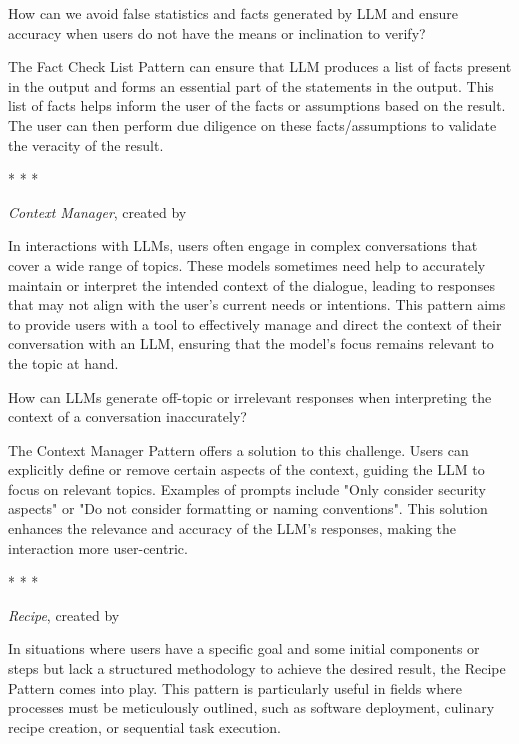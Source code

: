  How can we avoid false statistics and facts generated by LLM and ensure accuracy when users do not have the means or inclination to verify?

 The Fact Check List Pattern can ensure that LLM produces a list of facts present in the output and forms an essential part of the statements in the output. This list of facts helps inform the user of the facts or assumptions based on the result. The user can then perform due diligence on these facts/assumptions to validate the veracity of the result.

\begin{center}
*           *           * 
\end{center}

\textit{Context Manager}, created by \textcite{white2023prompt}

 In interactions with LLMs, users often engage in complex conversations that cover a wide range of topics. These models sometimes need help to accurately maintain or interpret the intended context of the dialogue, leading to responses that may not align with the user's current needs or intentions. This pattern aims to provide users with a tool to effectively manage and direct the context of their conversation with an LLM, ensuring that the model's focus remains relevant to the topic at hand.

How can LLMs generate off-topic or irrelevant responses when interpreting the context of a conversation inaccurately?

 The Context Manager Pattern offers a solution to this challenge. Users can explicitly define or remove certain aspects of the context, guiding the LLM to focus on relevant topics. Examples of prompts include "Only consider security aspects" or "Do not consider formatting or naming conventions". This solution enhances the relevance and accuracy of the LLM's responses, making the interaction more user-centric.

\begin{center}
*           *           * 
\end{center}

\textit{Recipe}, created by \textcite{white2023prompt}

 In situations where users have a specific goal and some initial components or steps but lack a structured methodology to achieve the desired result, the Recipe Pattern comes into play. This pattern is particularly useful in fields where processes must be meticulously outlined, such as software deployment, culinary recipe creation, or sequential task execution.

